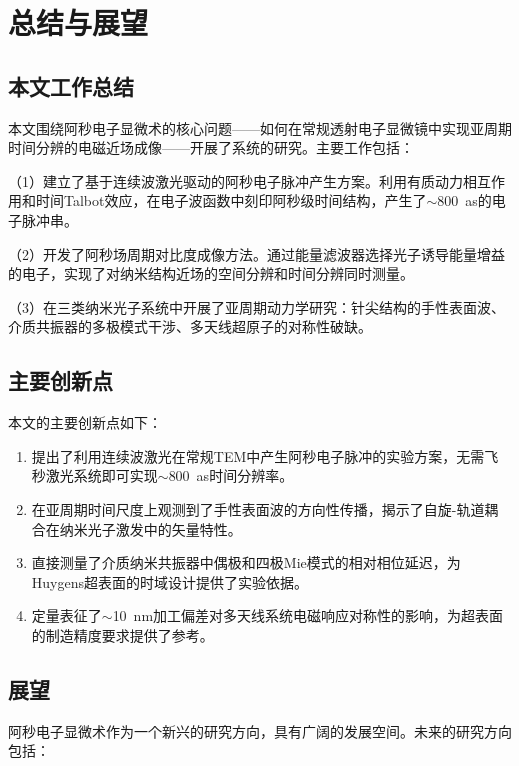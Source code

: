 \chapter{总结与展望}
\label{chap:conclusion}

\section{本文工作总结}
\label{sec:summary}

本文围绕阿秒电子显微术的核心问题——如何在常规透射电子显微镜中实现亚周期时间分辨的电磁近场成像——开展了系统的研究。主要工作包括：

（1）建立了基于连续波激光驱动的阿秒电子脉冲产生方案。利用有质动力相互作用和时间Talbot效应，在电子波函数中刻印阿秒级时间结构，产生了$\sim$\SI{800}{as}的电子脉冲串。

（2）开发了阿秒场周期对比度成像方法。通过能量滤波器选择光子诱导能量增益的电子，实现了对纳米结构近场的空间分辨和时间分辨同时测量。

（3）在三类纳米光子系统中开展了亚周期动力学研究：针尖结构的手性表面波、介质共振器的多极模式干涉、多天线超原子的对称性破缺。

\section{主要创新点}
\label{sec:innovation}

本文的主要创新点如下：

\begin{enumerate}
    \item 提出了利用连续波激光在常规TEM中产生阿秒电子脉冲的实验方案，无需飞秒激光系统即可实现$\sim$\SI{800}{as}时间分辨率。
    \item 在亚周期时间尺度上观测到了手性表面波的方向性传播，揭示了自旋-轨道耦合在纳米光子激发中的矢量特性。
    \item 直接测量了介质纳米共振器中偶极和四极Mie模式的相对相位延迟，为Huygens超表面的时域设计提供了实验依据。
    \item 定量表征了$\sim$\SI{10}{nm}加工偏差对多天线系统电磁响应对称性的影响，为超表面的制造精度要求提供了参考。
\end{enumerate}

\section{展望}
\label{sec:outlook}

阿秒电子显微术作为一个新兴的研究方向，具有广阔的发展空间。未来的研究方向包括：

